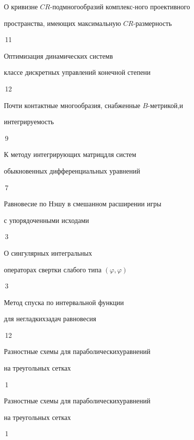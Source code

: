 {О кривизне $CR$-подмногообразий комплекс-\newline ного проективного


пространства, имеющих максимальную $CR$-размерность}{\No\,11}




{Оптимизация динамических систем\newline в


классе дискретных управлений конечной степени}{\No\,12}




{Почти контактные многообразия, снабженные $B$-метрикой,\newline и 


интегрируемость}{\No\,9}




{К методу интегрирующих матриц\newline для систем


обыкновенных дифференциальных уравнений}{\No\,7}




{Равновесие по Нэшу в смешанном расширении игры \newline


с упорядоченными исходами}{\No\,3}




{О сингулярных интегральных 


операторах свертки слабого типа $(\varphi,\varphi)$}{\No\,3}




{Метод спуска по интервальной функции


для негладких\newline задач равновесия}{\No\,12}




{Разностные схемы для параболических\newline уравнений


на треугольных сетках}{\No\,1}




{Разностные схемы для параболических\newline уравнений


на треугольных сетках}{\No\,1}




